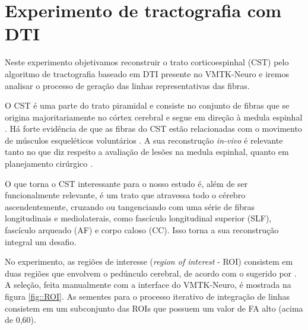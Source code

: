 \documentclass[
    12pt,                %
    oneside,            %
    a4paper,            %
    english,            %
    french,                %
    spanish,            %
    brazil                %
    ]{abntex2}
\begin{document}
\section{Experimento de tractografia com DTI}

Neste experimento objetivamos reconstruir o trato corticoespinhal (CST) pelo algoritmo de tractografia baseado em DTI presente no VMTK-Neuro e iremos analisar o processo de geração das linhas representativas das fibras.


O CST é uma parte do trato piramidal e consiste no conjunto de fibras que se origina majoritariamente no córtex cerebral e segue em direção à medula espinhal \cite{Kolb2015}. Há forte evidência de que as fibras do CST estão relacionadas com o movimento de músculos esqueléticos voluntários \cite{zhang2018}.
A sua reconstrução \textit{in-vivo} é relevante tanto no que diz respeito a avaliação de lesões na medula espinhal, quanto em planejamento cirúrgico \cite{zhang2018}.

O que torna o CST interessante para o nosso estudo é, além de ser funcionalmente relevante, é um trato que atravessa todo o cérebro ascendentemente, cruzando ou tangenciando com uma série de fibras longitudinais e mediolaterais, como fascículo longitudinal superior (SLF), fascículo arqueado (AF) e corpo caloso (CC). Isso torna a sua reconstrução integral um desafio.



No experimento, as regiões de interesse (\textit{region of interest} - ROI) consistem em duas regiões que envolvem o pedúnculo cerebral, de acordo com o sugerido por . A seleção, feita manualmente com a interface do VMTK-Neuro, é mostrada na figura \ref{fig::ROI}. As sementes para o processo iterativo de integração de linhas consistem em um subconjunto das ROIs que possuem um valor de FA alto (acima de 0,60).
\end{document}

